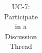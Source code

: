 \begin{table}[H]
\begin{tabular}{|p{4cm}|p{11cm}|}
\end{tabular}
\caption{UC-7: Participate in a Discussion Thread}
\end{table}
